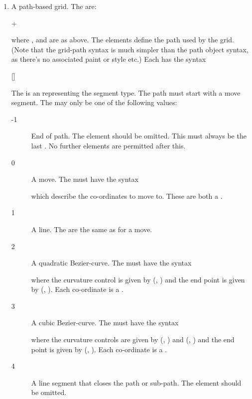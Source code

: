 \begin{numbered}
\begin{enumerate}
\begin{enumerate}
    \item A path-based grid. The  are:
     \begin{syntaxline}
        +
     \end{syntaxline}
     where ,  and  are as above. The
      elements define the path used by the grid.
     (Note that the grid-path syntax is much simpler than the
     \gls{path} object syntax, as there's no associated paint or
     style etc.) Each  has the syntax
     \begin{syntaxline}
      []
     \end{syntaxline}
    The  is an  representing the
     segment type. The path must start with a move segment. The
      may only be one of the following values:
     \begin{description}
      \item[-1] End of path. The  element should be
       omitted. This must always be the last .
       No further  elements are
       permitted after this.
      \item[0] A move. The  must have the syntax
      \begin{syntaxline}
        
      \end{syntaxline}
      which describe the co-ordinates to move to. These are both a
      .
      \item[1] A line. The  are the same as for
      a move.
      \item[2] A quadratic \gls{Bezier-curve}. The  must have
       the syntax
      \begin{syntaxline}
          
      \end{syntaxline}
      where the curvature control is given by (, )
      and the end point is given by (, ). Each
      co-ordinate is a .
      \item[3] A cubic \gls{Bezier-curve}. The  must have
       the syntax
      \begin{syntaxline}
            
      \end{syntaxline}
      where the curvature controls are given by (,
      ) and (, )
      and the end point is given by (, ). Each
      co-ordinate is a .
      \item[4] A line segment that closes the path or sub-path.
      The  element should be omitted.
     \end{description}


\end{enumerate}
\end{enumerate}
\end{numbered}
